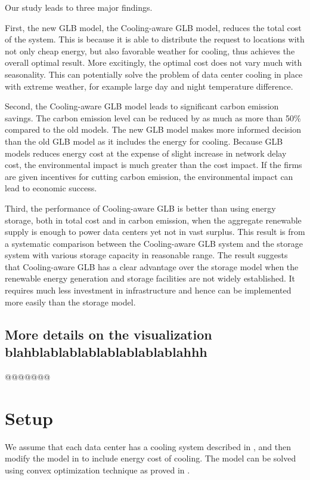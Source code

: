 \documentclass{acm_proc_article-sp}
\begin{document}
Our study leads to three major findings.

First, the new GLB model, the Cooling-aware GLB model, reduces the total cost of the system. This is because it is able to distribute the request to locations with not only cheap energy, but also favorable weather for cooling, thus achieves the overall optimal result. More excitingly, the optimal cost does not vary much with seasonality. This can potentially solve the problem of data center cooling in place with extreme weather, for example large day and night temperature difference.  

Second, the Cooling-aware GLB model leads to significant carbon emission savings. The carbon emission level can be reduced by as much as more than 50\% compared to the old models. The new GLB model makes more informed decision than the old GLB model as it includes the energy for cooling. Because GLB models reduces energy cost at the expense of slight increase in network delay cost, the environmental impact is much greater than the cost impact. If the firms are given incentives for cutting carbon emission, the environmental impact can lead to economic success.  

Third, the performance of Cooling-aware GLB is better than using energy storage, both in total cost and in carbon emission, when the aggregate renewable supply is enough to power data centers yet not in vast surplus. This result is from a systematic comparison between the Cooling-aware GLB system and the storage system with various storage capacity in reasonable range. The result suggests that Cooling-aware GLB has a clear advantage over the storage model when the renewable energy generation and storage facilities are not widely established. It requires much less investment in infrastructure and hence can be implemented more easily than the storage model.


\subsection{More details on the visualization blahblablablablablablablablahhh}
@@@@@@@


\section{Setup}
We assume that each data center has a cooling system described in \cite{adam:cooling}, and then modify the model in \cite{adam:GLB} to include energy cost of cooling. The model can be solved using convex optimization technique as proved in \cite{adam:GLBfull}.
\end{document}
